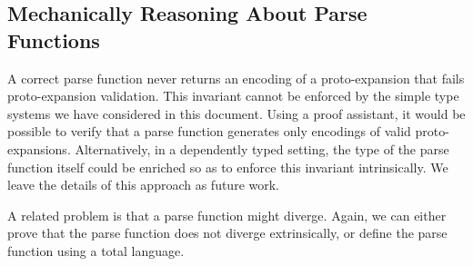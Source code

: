 




\subsection{Mechanically Reasoning About Parse Functions}\label{sec:verifying-tsms}
A correct parse function never returns an encoding of a proto-expansion that fails proto-expansion validation. This invariant cannot be enforced by the simple type systems we have considered in this document. Using a proof assistant, it would be possible to verify that a parse function generates only encodings of valid proto-expansions. Alternatively, in a dependently typed setting, the type of the parse function itself could be enriched so as to enforce this invariant intrinsically. We leave the details of this approach as future work.

A related problem is that a parse function might diverge. Again, we can either prove that the parse function does not diverge extrinsically, or define the parse function using a total language.

